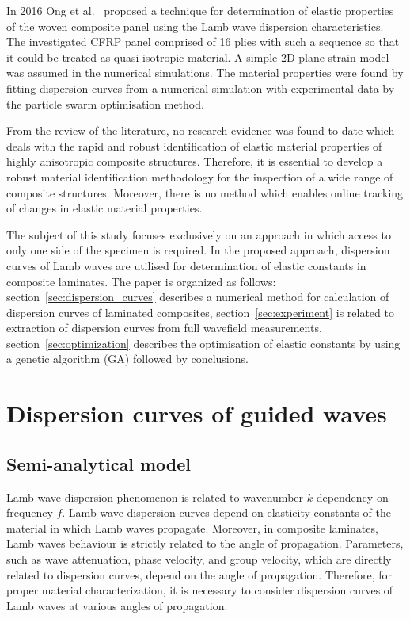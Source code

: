 \documentclass[preprint,12pt]{elsarticle}
\begin{document}
	In 2016 Ong et al.~\cite{Ong2016} proposed a technique for determination of elastic properties of the woven composite panel using the Lamb wave dispersion characteristics. The investigated CFRP panel comprised of 16 plies with such a sequence so that it could be treated as quasi-isotropic material. A simple 2D plane strain model was assumed in the numerical simulations. The material properties were found by fitting dispersion curves from a numerical simulation with experimental data by the particle swarm optimisation method. 
	
	From the review of the literature, no research evidence was found to date which deals with the rapid and robust identification of elastic material properties of highly anisotropic composite structures. Therefore, it is essential to develop a robust material identification methodology for the inspection of a wide range of composite structures. Moreover, there is no method which enables online tracking of changes in elastic material properties.
	
	The subject of this study focuses exclusively on an approach in which access to only one side of the specimen is required. In the proposed approach, dispersion curves of Lamb waves are utilised for determination of elastic constants in composite laminates. The paper is organized as follows: section~\ref{sec:dispersion_curves} describes a numerical method for calculation of dispersion curves of laminated composites, section~\ref{sec:experiment} is related to extraction of dispersion curves from full wavefield measurements, section~\ref{sec:optimization} describes the optimisation of elastic constants by using a genetic algorithm (GA) followed by conclusions.
	
	
\section{Dispersion curves of guided waves \label{sec:dispersion_curves}}
\subsection{Semi-analytical model}
Lamb wave dispersion phenomenon is related to wavenumber \(k\) dependency on frequency \(f\). 
Lamb wave dispersion curves depend on elasticity constants of the material in which Lamb waves propagate. 
Moreover, in composite laminates, Lamb waves behaviour is strictly related to the angle of propagation. 
Parameters, such as wave attenuation, phase velocity, and group velocity, which are directly related to dispersion curves, depend on the angle of propagation. 
Therefore, for proper material characterization, it is necessary to consider dispersion curves of Lamb waves at various angles of propagation.
	
\end{document}
